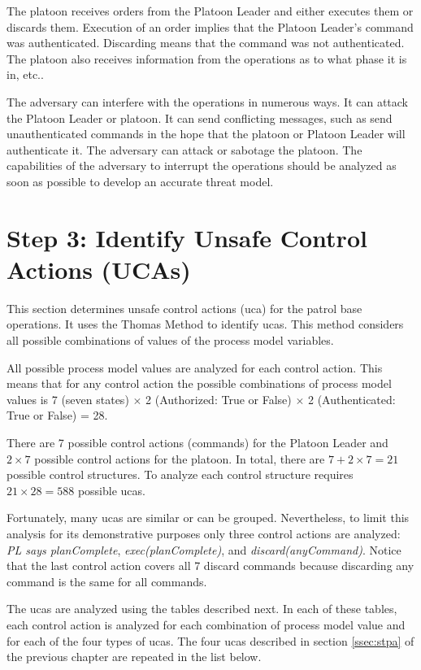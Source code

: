 \documentclass[../../main/main.tex]{subfiles}
\begin{document}
The platoon receives orders from the Platoon Leader and either executes them or discards them.  Execution of an order implies that the Platoon Leader's command was authenticated.  Discarding means that the command was not authenticated.  The platoon also receives information from the operations as to what phase it is in, etc..

The adversary can interfere with the operations in numerous ways.  It can attack the Platoon Leader or platoon.  It can send conflicting messages, such as send unauthenticated commands in the hope that the platoon or Platoon Leader will authenticate it.  The adversary can attack or sabotage the platoon.  The capabilities of the adversary to interrupt the operations should be analyzed as soon as possible to develop an accurate threat model.
\clearpage

\section{Step 3: Identify Unsafe Control Actions (UCAs)}\label{chp:stpapb:uca}
This section determines unsafe control actions (\gls{uca}) for the patrol base operations.  It uses the Thomas Method to identify \glspl{uca}.  This method considers all possible combinations of values of the process model variables.  

All possible process model values are analyzed for each control action. This means that for any control action the possible combinations of process model values is 7 (seven states) $\times$ 2 (Authorized: True or False) $\times$ 2 (Authenticated: True or False) = 28.  

There are 7 possible control actions (commands) for the Platoon Leader and $2 \times 7$ possible control actions for the platoon.  In total, there are $7 + 2 \times 7 = 21$  possible control structures.  To analyze each control structure requires $21 \times 28 = 588$ possible \glspl{uca}. 

Fortunately, many \glspl{uca} are similar or can be grouped.  Nevertheless, to limit this analysis for its demonstrative purposes only three control actions are analyzed: \textit{PL says planComplete}, \textit{exec(planComplete)}, and \textit{discard(anyCommand)}.  Notice that the last control action covers all 7 discard commands because discarding any command is the same for all commands.

The \glspl{uca} are analyzed using the tables described next.  In each of these tables, each control action is analyzed for each combination of process model value and for each of the four types of \glspl{uca}.  The four \glspl{uca} described in section \ref{ssec:stpa} of the previous chapter are repeated in the list below.
\end{document}
